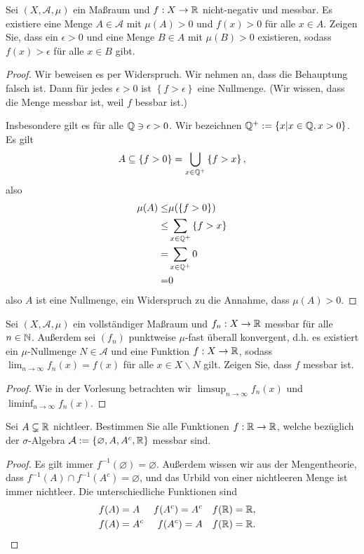 
\begin{Problem}
	Sei $(X,\mathcal{A},\mu)$ ein Maßraum und $f:X\to \mathbb{R}$ nicht-negativ und messbar. Es existiere eine Menge $A\in \mathcal{A}$ mit $\mu(A)>0$ und $f(x)>0$ f\"{u}r alle $x\in A$. Zeigen Sie, dass ein $\epsilon>0$ und eine Menge $B\in A$ mit $\mu(B)>0$ existieren, sodass $f(x)>\epsilon$ f\"{u}r alle $x\in B$ gibt.
\end{Problem}

\begin{proof}
	Wir beweisen es per Widerspruch. Wir nehmen an, dass die Behauptung falsch ist. Dann f\"{u}r jedes $\epsilon>0$ ist $\left\{ f>\epsilon \right\} $ eine Nullmenge. (Wir wissen, dass die Menge messbar ist, weil $f$ bessbar ist.)

	Insbesondere gilt es f\"{u}r alle $\mathbb{Q}\ni \epsilon >0$. Wir bezeichnen $\mathbb{Q}^+:=\left\{ x|x\in \mathbb{Q}, x>0 \right\} $. Es gilt
	\[
	A\subseteq \left\{ f>0 \right\} =\bigcup_{x\in \mathbb{Q}^+} \left\{ f>x \right\} 
,\] 
also
\begin{align*}
	\mu(A)\le& \mu(\left\{ f>0 \right\} )\\
	\le& \sum_{x\in \mathbb{Q}^+} \left\{ f>x \right\} \\
	=& \sum_{x\in \mathbb{Q}^+} 0\\
	=& 0
\end{align*}
also $A$ ist eine Nullmenge, ein Widerspruch zu die Annahme, dass $\mu(A)>0$.
\end{proof}
\begin{Problem}
	Sei $(X,\mathcal{A},\mu)$ ein vollst\"{a}ndiger Maßraum und $f_n:X\to \mathbb{R}$ messbar f\"{u}r alle $n\in \mathbb{N}$. Außerdem sei $(f_n)$ punktweise $\mu$-fast überall konvergent, d.h. es existiert ein $\mu$-Nullmenge $N\in \mathcal{A}$ und eine Funktion $f:X\to \mathbb{R}$, sodass $\lim_{n \to \infty} f_n(x)=f(x)$ f\"{u}r alle $x\in X\backslash N$ gilt. Zeigen Sie, dass $f$ messbar ist.
\end{Problem}
\begin{proof}
	Wie in der Vorlesung betrachten wir $\limsup_{n\to\infty} f_n(x)$ und $\liminf_{n\to \infty} f_n(x)$.
\end{proof}
\begin{Problem}
	Sei $A\subsetneq \mathbb{R}$ nichtleer. Bestimmen Sie alle Funktionen $f:\mathbb{R}\to \mathbb{R}$, welche bezüglich der $\sigma$-Algebra $\mathcal{A}:=\left\{ \varnothing, A,A^c, \mathbb{R} \right\} $ messbar sind.
\end{Problem}
\begin{proof}
	Es gilt immer $f^{-1}(\varnothing)=\varnothing$. Außerdem wissen wir aus der Mengentheorie, dass $f^{-1}(A)\cap f^{-1}(A^c)=\varnothing$, und das Urbild von einer nichtleeren Menge ist immer nichtleer. Die unterschiedliche Funktionen sind
	\begin{align*}
		& f(A)=A & f(A^c)=A^c & & f(\mathbb{R})=\mathbb{R}, \\
		& f(A)=A^c & f(A^c)=A & & f(\mathbb{R})=\mathbb{R}. & \qedhere
	\end{align*}
\end{proof}
